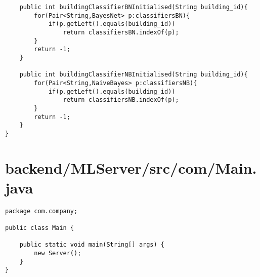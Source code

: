 \begin{lstlisting}
    public int buildingClassifierBNInitialised(String building_id){
        for(Pair<String,BayesNet> p:classifiersBN){
            if(p.getLeft().equals(building_id))
                return classifiersBN.indexOf(p);
        }
        return -1;
    }

    public int buildingClassifierNBInitialised(String building_id){
        for(Pair<String,NaiveBayes> p:classifiersNB){
            if(p.getLeft().equals(building_id))
                return classifiersNB.indexOf(p);
        }
        return -1;
    }
}
\end{lstlisting}
\newpage
\section{backend/MLServer/src/com/Main.java}
\begin{lstlisting}package com.company;

public class Main {

    public static void main(String[] args) {
        new Server();
    }
}
\end{lstlisting}
\newpage
